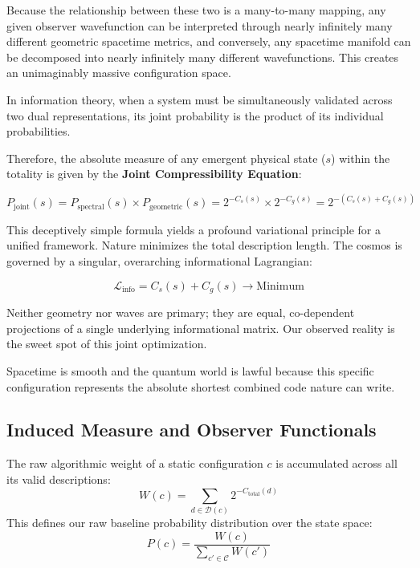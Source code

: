 Because the relationship between these two is a many-to-many mapping, any given observer wavefunction can be interpreted through nearly infinitely many different geometric spacetime metrics, and conversely, any spacetime manifold can be decomposed into nearly infinitely many different wavefunctions.
This creates an unimaginably massive configuration space. 

In information theory, when a system must be simultaneously validated across two dual representations,
its joint probability is the product of its individual probabilities.

Therefore, the absolute measure of any emergent physical state ($s$) within the totality is given by the \textbf{Joint Compressibility Equation}:

\begin{equation}
P_{\text{joint}}(s) = P_{\text{spectral}}(s) \times P_{\text{geometric}}(s) = 2^{-C_s(s)} \times 2^{-C_g(s)} = 2^{-\left(C_s(s) + C_g(s)\right)}
\end{equation}

This deceptively simple formula yields a profound variational principle for a unified framework.
Nature minimizes the total description length.
The cosmos is governed by a singular, overarching informational Lagrangian:

\begin{equation}
\label{eq:lagrangian}
\mathcal{L}_{\text{info}} = C_s(s) + C_g(s) \longrightarrow \text{Minimum}
\end{equation}

Neither geometry nor waves are primary; they are equal, co-dependent projections of a single underlying informational matrix.
Our observed reality is the sweet spot of this joint optimization.

Spacetime is smooth and the quantum world is lawful because this specific configuration represents the absolute shortest combined code nature can write.



\subsection*{Induced Measure and Observer Functionals}

The raw algorithmic weight of a static configuration $c$ is accumulated across all its valid descriptions:
\[
W(c) = \sum_{d \in \mathcal{D}(c)} 2^{-C_{\text{total}}(d)}
\]
This defines our raw baseline probability distribution over the state space:
\[
P(c) = \frac{W(c)}{\sum_{c'\in\mathcal{C}} W(c')}
\]

